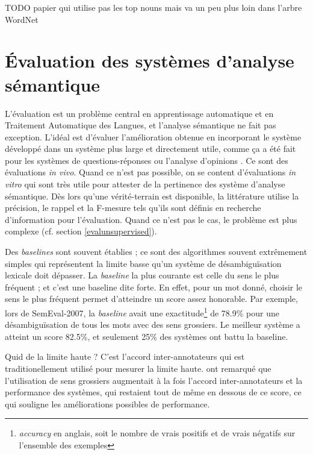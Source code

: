 TODO papier qui utilise pas les top nouns mais va un peu plus loin dans l'arbre WordNet


\section{Évaluation des systèmes d'analyse sémantique}
\label{evaluation}

L'évaluation est un problème central en apprentissage automatique et en Traitement Automatique des Langues, et l'analyse sémantique ne fait pas exception. L'idéal est d'évaluer l'amélioration obtenue en incorporant le système développé dans un système plus large et directement utile, comme ça a été fait pour les systèmes de questions-réponses \citep{shen2007using} ou l'analyse d'opinions \citep{das2012structure}. Ce sont des évaluations \textit{in vivo}. Quand ce n'est pas possible, on se content d'évaluations \textit{in vitro} qui sont très utile pour attester de la pertinence des système d'analyse sémantique. Dès lors qu'une vérité-terrain est disponible, la littérature utilise la précision, le rappel et la F-mesure tels qu'ils sont définis en recherche d'information pour l'évaluation. Quand ce n'est pas le cas, le problème est plus complexe (cf. section \ref{evalunsupervised}).

Des \textit{baselines} sont souvent établies ; ce sont des algorithmes souvent extrêmement simples qui représentent la limite basse qu'un système de désambiguïsation lexicale doit dépasser. La \textit{baseline} la plus courante est celle du sens le plus fréquent ; et c'est une baseline dite forte. En effet, pour un mot donné, choisir le sens le plus fréquent permet d'atteindre un score assez honorable. Par exemple, lors de SemEval-2007, la \textit{baseline} avait une exactitude\footnote{\textit{accuracy} en anglais, soit le nombre de vrais positifs et de vrais négatifs sur l'ensemble des exemples} de 78.9\% pour une désambiguïsation de tous les mots avec des sens grossiers. Le meilleur système a atteint un score 82.5\%, et seulement 25\% des systèmes ont battu la baseline.

Quid de la limite haute ? C'est l'accord inter-annotateurs qui est traditionellement utilisé pour mesurer la limite haute. \cite{navigli2007semeval}
ont remarqué que l'utilisation de sens grossiers augmentait à la fois l'accord inter-annotateurs et la performance des systèmes, qui restaient tout de même en dessous de ce score, ce qui souligne les améliorations possibles de performance.


